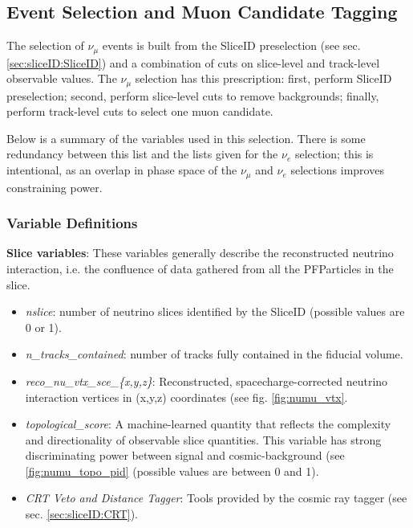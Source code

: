 \label{sec:NuMUCCsel}

\subsection{Event Selection and Muon Candidate Tagging}
\label{ssec:NuMUCCsel:sel}

\par The selection of $\nu_{\mu}$ events is built from the SliceID preselection (see sec. \ref{sec:sliceID:SliceID}) and a combination of cuts on slice-level and track-level observable values. The $\nu_{\mu}$ selection has this prescription: first, perform SliceID preselection; second, perform slice-level cuts to remove backgrounds; finally, perform track-level cuts to select one muon candidate.
\par Below is a summary of the variables used in this selection. There is some redundancy between this list and the lists given for the $\nu_e$ selection; this is intentional, as an overlap in phase space of the $\nu_{\mu}$ and $\nu_{e}$ selections improves constraining power.

\subsubsection{Variable Definitions}
\label{sssec:NuMUCCsel:sel:vars}

\par \noindent \textbf{Slice variables}: These variables generally describe the reconstructed neutrino interaction, i.e. the confluence of data gathered from all the PFParticles in the slice.
\begin{itemize}
    \item \emph{nslice}: number of neutrino slices identified by the SliceID (possible values are 0 or 1).
    \item \emph{n\_tracks\_contained}: number of tracks fully contained in the fiducial volume.
    \item \emph{reco\_nu\_vtx\_sce\_\{x,y,z\}}: Reconstructed, spacecharge-corrected neutrino interaction vertices in (x,y,z) coordinates (see fig. \ref{fig:numu_vtx}.
    \item \emph{topological\_score}: A machine-learned quantity that reflects the complexity and directionality of observable slice quantities. This variable has strong discriminating power between signal and cosmic-background (see \ref{fig:numu_topo_pid} (possible values are between 0 and 1).
    \item \emph{CRT Veto and Distance Tagger}: Tools provided by the cosmic ray tagger (see sec. \ref{sec:sliceID:CRT}).
\end{itemize}

